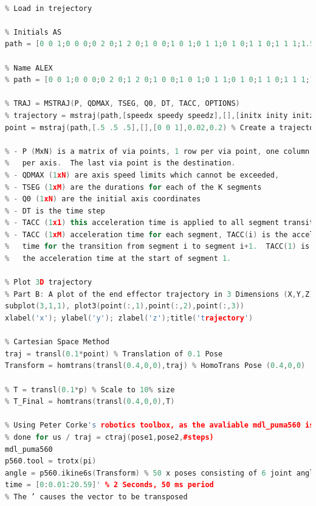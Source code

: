 \documentclass[a4paper, 10pt]{article}
\begin{document}
\begin{lstlisting}[language = C++]

% Load in trejectory

% Initials AS
path = [0 0 1;0 0 0;0 2 0;1 2 0;1 0 0;1 0 1;0 1 1;0 1 0;1 1 0;1 1 1;1.5 0.5 1;1.5 0.5 0;1.5 0 0;2.5 0 0;2.5 0.5 0;1.5 1.5 0;1.5 2 0;2.5 2 0;2.5 1.5 0;2.5 1.5 1;]

% Name ALEX
% path = [0 0 1;0 0 0;0 2 0;1 2 0;1 0 0;1 0 1;0 1 1;0 1 0;1 1 0;1 1 1;1.5 2 1;1.5 2 0;1.5 0 0;2.5 0 0; 2.5 0 1;4 2 1;4 2 0;3 2 0;3 0 0;4 0 0;4 0 1;3 1 1;3 1 0;4 1 0;4 1 1;4.5 2 1;4.5 2 0;5.5 0 0;5.5 0 1;5.5 2 1;5.5 2 0;4.5 0 0;4.5 0 1;]

% TRAJ = MSTRAJ(P, QDMAX, TSEG, Q0, DT, TACC, OPTIONS)
% trajectory = mstraj(path,[speedx speedy speedz],[],[initx inity initz],sampleperiod,acceltime)
point = mstraj(path,[.5 .5 .5],[],[0 0 1],0.02,0.2) % Create a trajectory of points

% - P (MxN) is a matrix of via points, 1 row per via point, one column 
%   per axis.  The last via point is the destination.
% - QDMAX (1xN) are axis speed limits which cannot be exceeded,
% - TSEG (1xM) are the durations for each of the K segments
% - Q0 (1xN) are the initial axis coordinates
% - DT is the time step
% - TACC (1x1) this acceleration time is applied to all segment transitions
% - TACC (1xM) acceleration time for each segment, TACC(i) is the acceleration 
%   time for the transition from segment i to segment i+1.  TACC(1) is also 
%   the acceleration time at the start of segment 1.

% Plot 3D trajectory
% Part B: A plot of the end effector trajectory in 3 Dimensions (X,Y,Z)
subplot(3,1,1), plot3(point(:,1),point(:,2),point(:,3))
xlabel('x'); ylabel('y'); zlabel('z');title('trajectory')

% Cartesian Space Method
traj = transl(0.1*point) % Translation of 0.1 Pose
Transform = homtrans(transl(0.4,0,0),traj) % HomoTrans Pose (0.4,0,0) (pose1,pose2,time) of the trajectory

% T = transl(0.1*p) % Scale to 10% size
% T_Final = homtrans(transl(0.4,0,0),T)

% Using Peter Corke's robotics toolbox, as the avaliable mdl_puma560 is already
% done for us / traj = ctraj(pose1,pose2,#steps)
mdl_puma560
p560.tool = trotx(pi)
angle = p560.ikine6s(Transform) % 50 x poses consisting of 6 joint angles, inverse kinematic of the transform
time = [0:0.01:20.59]' % 2 Seconds, 50 ms period
% The ’ causes the vector to be transposed


\end{lstlisting}
\end{document}
